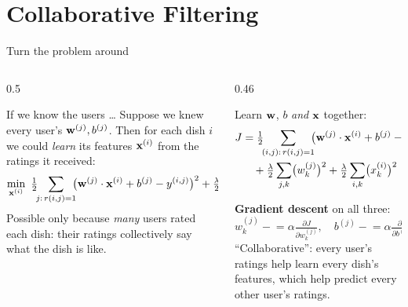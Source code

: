 \documentclass[aspectratio=169,10pt]{beamer}
\begin{document}
\section{Collaborative Filtering}

\begin{frame}{Turn the problem around}
  \begin{columns}[T,onlytextwidth]
    \begin{column}{0.5\textwidth}
      \begin{block}{If we know the users \dots}
        \footnotesize
        Suppose we knew every user's $\mathbf{w}^{(j)}, b^{(j)}$. Then for each dish $i$ we could
        \emph{learn} its features $\mathbf{x}^{(i)}$ from the ratings it received:
        \[ \min_{\vx^{(i)}}\ \tfrac12\!\!\sum_{j:\,r(i,j)=1}\!\!\bigl(\vw^{(j)}\cdot\vx^{(i)} + b^{(j)} - y^{(i,j)}\bigr)^2
           + \tfrac{\lambda}{2}\sum_k \bigl(x^{(i)}_k\bigr)^2 \]
        Possible only because \emph{many} users rated each dish: their ratings
        collectively say what the dish is like.
      \end{block}
    \end{column}
    \begin{column}{0.46\textwidth}
      \begin{defnbox}
        \small
        Learn $\mathbf{w}$, $b$ \emph{and} $\mathbf{x}$ together:
        \begin{align*}
          J &= \tfrac12\!\!\sum_{(i,j):\,r(i,j)=1}\!\!\bigl(\mathbf{w}^{(j)}\cdot\mathbf{x}^{(i)} + b^{(j)} - y^{(i,j)}\bigr)^2\\
            &\quad + \tfrac{\lambda}{2}\sum_{j,k}\bigl(w^{(j)}_k\bigr)^2
               + \tfrac{\lambda}{2}\sum_{i,k}\bigl(x^{(i)}_k\bigr)^2
        \end{align*}
      \end{defnbox}
      \footnotesize
      \textbf{Gradient descent} on all three:
      \[ w^{(j)}_k \mathrel{-}= \alpha\tfrac{\partial J}{\partial w^{(j)}_k},\quad
         b^{(j)} \mathrel{-}= \alpha\tfrac{\partial J}{\partial b^{(j)}},\quad
         x^{(i)}_k \mathrel{-}= \alpha\tfrac{\partial J}{\partial x^{(i)}_k} \]
      ``Collaborative'': every user's ratings help learn every dish's features, which
      help predict every other user's ratings.
    \end{column}
  \end{columns}
\end{frame}
\end{document}
